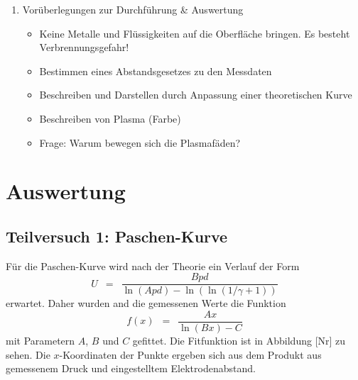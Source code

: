 \documentclass{article}
\newcommand{\widespace}{\enspace}
\newcommand{\wideeq}{\widespace = \widespace}
\begin{document}
\begin{enumerate}[label = (\Roman*)]
    \item Vorüberlegungen zur Durchführung \& Auswertung
        \begin{itemize}
            \item Keine Metalle und Flüssigkeiten auf die Oberfläche bringen. Es besteht Verbrennungsgefahr!
            \item Bestimmen eines Abstandsgesetzes zu den Messdaten
            \item Beschreiben und Darstellen durch Anpassung einer theoretischen Kurve
            \item Beschreiben von Plasma (Farbe)
            \item Frage: Warum bewegen sich die Plasmafäden?
        \end{itemize}
        
\end{enumerate}

\newpage

\section{Auswertung}

\subsection{Teilversuch 1: Paschen-Kurve}

Für die Paschen-Kurve wird nach der Theorie ein Verlauf der Form
\[
    U \wideeq \frac{Bpd}{\ln(Apd) - \ln(\ln(1 / \gamma + 1))}
\]
erwartet. Daher wurden and die gemessenen Werte die Funktion
\[
    f(x) \wideeq \frac{A x}{\ln(B x) - C}
\]
mit Parametern $A$, $B$ und $C$ gefittet.
Die Fitfunktion ist in Abbildung [Nr] zu sehen. Die $x$-Koordinaten der Punkte
ergeben sich aus dem Produkt aus gemessenem Druck und eingestelltem Elektrodenabstand.
\end{document}
